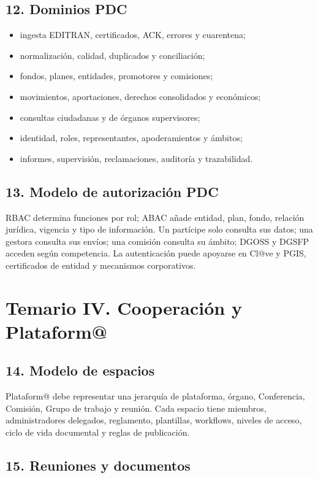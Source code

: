 \documentclass[11pt,a4paper]{article}
\begin{document}
\subsection{12. Dominios PDC}
\begin{itemize}
\item ingesta EDITRAN, certificados, ACK, errores y cuarentena;
\item normalización, calidad, duplicados y conciliación;
\item fondos, planes, entidades, promotores y comisiones;
\item movimientos, aportaciones, derechos consolidados y económicos;
\item consultas ciudadanas y de órganos supervisores;
\item identidad, roles, representantes, apoderamientos y ámbitos;
\item informes, supervisión, reclamaciones, auditoría y trazabilidad.
\end{itemize}

\subsection{13. Modelo de autorización PDC}

RBAC determina funciones por rol; ABAC añade entidad, plan, fondo, relación jurídica, vigencia y tipo de información. Un partícipe solo consulta sus datos; una gestora consulta sus envíos; una comisión consulta su ámbito; DGOSS y DGSFP acceden según competencia. La autenticación puede apoyarse en Cl@ve y PGIS, certificados de entidad y mecanismos corporativos.

\section{Temario IV. Cooperación y Plataform@}

\subsection{14. Modelo de espacios}

Plataform@ debe representar una jerarquía de plataforma, órgano, Conferencia, Comisión, Grupo de trabajo y reunión. Cada espacio tiene miembros, administradores delegados, reglamento, plantillas, workflows, niveles de acceso, ciclo de vida documental y reglas de publicación.

\subsection{15. Reuniones y documentos}
\end{document}

